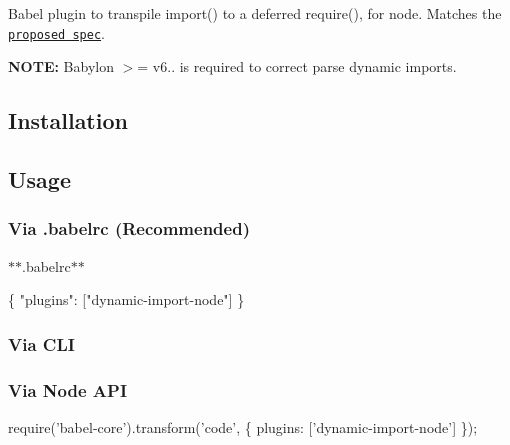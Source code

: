 Babel plugin to transpile {\ttfamily import()} to a deferred {\ttfamily require()}, for node. Matches the \href{https://github.com/domenic/proposal-import-function}{\tt proposed spec}.

{\bfseries N\+O\+TE\+:} Babylon $>$= v6.. is required to correct parse dynamic imports.

\subsection*{Installation}




\subsection*{Usage}

\subsubsection*{Via {\ttfamily .babelrc} (Recommended)}

$\ast$$\ast$.babelrc$\ast$$\ast$


\begin{DoxyCode}
\{
  "plugins": ["dynamic-import-node"]
\}
\end{DoxyCode}


\subsubsection*{Via C\+LI}




\subsubsection*{Via Node A\+PI}


\begin{DoxyCode}
require('babel-core').transform('code', \{
  plugins: ['dynamic-import-node']
\});
\end{DoxyCode}
 